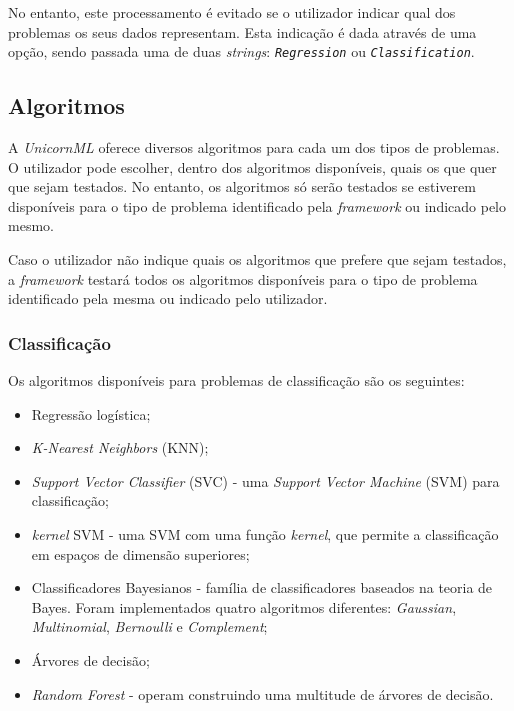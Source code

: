 \documentclass[a4paper]{report}
\begin{document}
{		No entanto, este processamento é evitado se o utilizador indicar qual dos problemas os seus dados representam.
		Esta indicação é dada através de uma opção, sendo passada uma de duas \textit{strings}: \textit{\texttt{Regression}} ou \textit{\texttt{Classification}}.

		\subsection{Algoritmos} \label{subsec:Algorithms}
		A \textsl{UnicornML} oferece diversos algoritmos para cada um dos tipos de problemas. 
		O utilizador pode escolher, dentro dos algoritmos disponíveis, quais os que quer que sejam testados. 
		No entanto, os algoritmos só serão testados se estiverem disponíveis para o tipo de problema identificado pela \textit{framework} ou indicado pelo mesmo.

		Caso o utilizador não indique quais os algoritmos que prefere que sejam testados, a \textit{framework} testará todos os algoritmos disponíveis para o tipo de problema identificado pela mesma ou indicado pelo utilizador.
            
			\subsubsection{Classificação} \label{sssec:Classification1}
			Os algoritmos disponíveis para problemas de classificação são os seguintes:
			\begin{itemize}
				\item Regressão logística;
				\item \textit{K-Nearest Neighbors} (KNN);
				\item \textit{Support Vector Classifier} (SVC) - uma \textit{Support Vector Machine} (SVM) para classificação;
				\item \textit{kernel} SVM - uma SVM com uma função \textit{kernel}, que permite a classificação em espaços de dimensão superiores;
				\item Classificadores Bayesianos - família de classificadores baseados na teoria de Bayes. Foram implementados quatro algoritmos diferentes: \textit{Gaussian}, \textit{Multinomial}, \textit{Bernoulli} e \textit{Complement};
				\item Árvores de decisão;
				\item \textit{Random Forest} - operam construindo uma multitude de árvores de decisão.
			\end{itemize}

}
\end{document}
